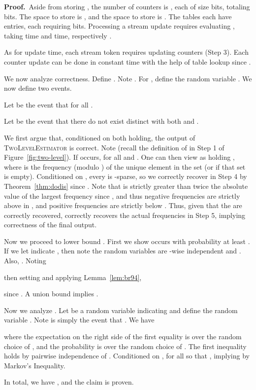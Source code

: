 \documentclass[letterpaper,11pt]{article}
\newcommand{\Lemma}[1]{Lemma~\ref{lem:#1}}
\newcommand{\Theorem}[1]{Theorem~\ref{thm:#1}}
\newcommand{\Figure}[1]{Figure~\ref{fig:#1}}
\newcommand{\proofbelow}{3pt}
\newcommand{\afterproof}{\hfill  \par \vspace{\proofbelow}}
\renewenvironment{proof}{\noindent\textbf{Proof.}\,}{\afterproof}
\begin{document}
\begin{proof}
Aside from storing ,  the number of counters is
, each of size  bits,
totaling  bits.
The space to store  is ,
and the space to store  is  \cite{CW79}.  The
tables  each have  entries, each
requiring  bits. Processing a stream update
requires evaluating , taking  time and 
time, respectively \cite{CW79}. 

As for update time, each stream token requires updating 
counters (Step 3). Each counter update can be done in constant time
with the help of table lookup since .

We now analyze correctness.  Define .
Note .  For
, define the random variable .  We now define two events.

Let  be the event that 
for all .

Let  be the event that there do not exist distinct
 with both  and .

We first argue that, conditioned on both 
holding, the output of \textsc{TwoLevelEstimator} is
correct. Note  (recall the
definition of  in Step 1 of \Figure{two-level}). If 
occurs,
 for all  and
.  One can then view  as holding
, where  is the frequency
(modulo ) of the unique
element in the set  (or  if that
set is empty).  Conditioned on , every  is
-sparse, so we correctly recover  in Step 4 by
\Theorem{dodis} since .  Note that  is
strictly greater than twice the absolute value of the largest
frequency since , and thus negative frequencies
are strictly above  in , and positive frequencies are
strictly below . Thus, given that the 
are correctly recovered,  correctly recovers the
actual frequencies in Step 5, implying correctness of the final
output.

Now we proceed to lower bound . First
we show  occurs with probability at least .
If we let  indicate , then note the random
variables  are -wise independent and . Also, .  
Noting 

then setting  and applying \Lemma{br94},

since .  A union bound implies .

Now we analyze .  Let  be a
random variable indicating  and define the random
variable . Note
 is simply the event that .  We have

where the expectation on the right side of the first equality is
over the random choice of
, and the probability is over the random choice of .  The
first inequality holds by pairwise independence of .
Conditioned on ,  for all
 so that , implying
 by Markov's Inequality.

In total, we have , and the claim is proven.
\end{proof}
\end{document}
